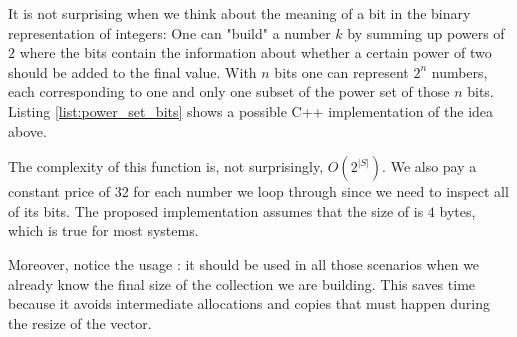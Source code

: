It is not surprising when we think about the meaning of a bit in the binary representation of integers: One
can "build" a number $k$ by summing up powers of $2$ where the bits contain the information about whether a
certain power of two should be added to the final value. With $n$
bits one can represent $2^n$ numbers, each corresponding to one and only one subset of the power set of those $n$ bits.
Listing \ref{list:power_set_bits} shows  a possible C++ implementation of the idea above.




The complexity of this function is, not surprisingly, $O(2^{|S|})$. 
We also pay a constant price of $32$ for each number we loop through since we need to inspect all of its bits.
The proposed implementation assumes that the size of  is $4$ bytes, which is true for most systems.

Moreover, notice the usage : it should be used in all those scenarios when we already know the final size of the collection we are building.
This saves time because it avoids intermediate allocations and copies that must happen during the resize of the vector.








